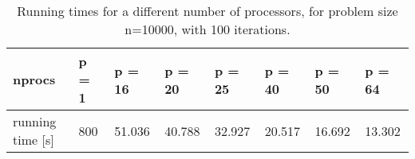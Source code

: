 \begin{table}
\caption{Running times for a different number of processors, for problem size n=10000, with 100 iterations.}
\begin{tabular}{|l|l|l|l|l|l|l|l|}
\hline
nprocs & p = 1 & p = 16 & p = 20 & p = 25 & p = 40 & p = 50 & p = 64 \\  \hline
running time [s] & 800 & 51.036 & 40.788 & 32.927 & 20.517 & 16.692 & 13.302 \\
\hline
\end{tabular}
\end{table}








